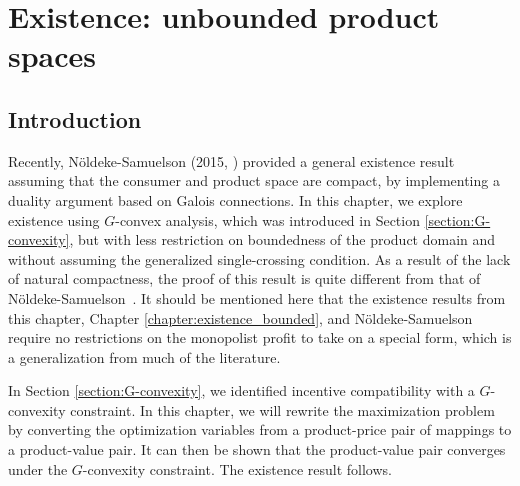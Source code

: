 \chapter{Existence: unbounded product spaces}\label{chapter:existence}




\section{Introduction}\label{section:introduction}

	
Recently, N\"oldeke-Samuelson (2015, \cite{NoldekeSamuelson15p}) provided a general existence result assuming that the consumer and product space are compact, by implementing a duality argument based on Galois connections.  In this chapter, we explore existence using $G$-convex analysis, which was introduced in Section \ref{section:G-convexity}, but with less restriction on boundedness of the product domain and without assuming the generalized single-crossing condition. As a result of the lack of natural compactness, the proof of this result is quite different from that of N\"oldeke-Samuelson~\cite{NoldekeSamuelson15p}. It should be mentioned here that the existence results from this chapter,  Chapter \ref{chapter:existence_bounded}, and N\"oldeke-Samuelson require no restrictions on the monopolist profit to take on a special form, which is a generalization from much of the literature.\medskip

In Section \ref{section:G-convexity}, we identified incentive compatibility with a $G$-convexity constraint. In this chapter, we will rewrite the maximization problem by converting the optimization variables from a product-price pair of mappings to a product-value pair. It can then be shown that the product-value pair converges under the $G$-convexity constraint. The existence result follows. \medskip



